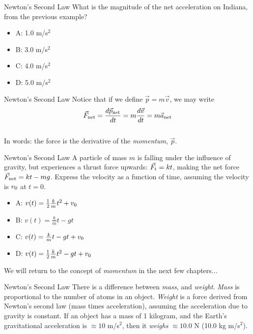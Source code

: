 \documentclass{beamer}
\begin{document}
\begin{frame}{Newton's Second Law}
What is the magnitude of the net acceleration on Indiana, from the previous example?
\begin{itemize}
\item A: 1.0 m/s$^2$
\item B: 3.0 m/s$^2$
\item C: 4.0 m/s$^2$
\item D: 5.0 m/s$^2$
\end{itemize}
\end{frame}

\begin{frame}{Newton's Second Law}
Notice that if we define $\vec{p} = m\vec{v}$, we may write \\
\vspace{0.5cm}
\begin{equation}
\vec{F}_{\rm net} = \frac{d\vec{p}_{\rm net}}{dt} = m \frac{d\vec{v}}{dt} = m \vec{a}_{\rm net}
\end{equation} \\
\vspace{0.5cm}
In words: the force is the derivative of the \textit{momentum}, $\vec{p}$.
\end{frame}

\begin{frame}{Newton's Second Law}
A particle of mass $m$ is falling under the influence of gravity, but experiences a thrust force upwards: $\vec{F}_{\rm t} = kt$, making the net force $\vec{F}_{\rm net} = kt - mg$.  Express the velocity as a function of time, assuming the velocity is $v_{\rm 0}$ at $t=0$.
\begin{itemize}
\item A: $v(t) = \frac{1}{2} \frac{k}{m} t^2+v_{\rm 0}$
\item B:  $v(t) = \frac{k}{m} t - gt$
\item C:  $v(t) = \frac{k}{m} t - gt +v_{\rm 0}$
\item D: $v(t) = \frac{1}{2} \frac{k}{m} t^2 - gt +v_{\rm 0}$
\end{itemize}
\vspace{0.5cm}
We will return to the concept of \textit{momentum} in the next few chapters...
\end{frame}

\begin{frame}{Newton's Second Law}
There is a difference between \alert{\textit{mass}}, and \alert{\textit{weight}}.  \textit{Mass} is proportional to the number of atoms in an object.  \textit{Weight} is a force derived from Newton's second law (mass times acceleration), assuming the acceleration due to gravity is constant.  If an object has a mass of 1 kilogram, and the Earth's gravitational acceleration is $\approx 10$ m/s$^2$, then it \textit{weighs} $\approx 10.0$ N (10.0 kg m/s$^2$).
\end{frame}
\end{document}
